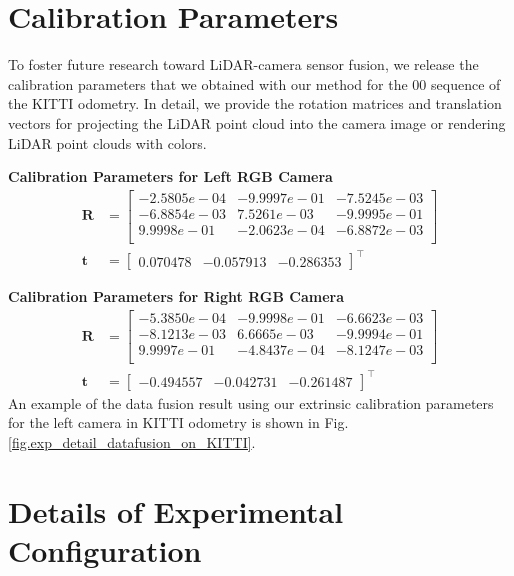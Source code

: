 \section{Calibration Parameters}
To foster future research toward LiDAR-camera sensor
fusion, we release the calibration parameters that we obtained with our method for the 00 sequence of the KITTI odometry. In detail, we provide the rotation matrices and translation vectors for projecting the LiDAR point cloud into the camera image or rendering LiDAR point clouds with colors. 

\noindent \textbf{Calibration Parameters for Left RGB Camera}
\[
\begin{aligned}
\boldsymbol{R} &= 
\begin{bmatrix}
-2.5805e-04 &-9.9997e-01 &-7.5245e-03 \\
-6.8854e-03 &7.5261e-03 &-9.9995e-01 \\
9.9998e-01 &-2.0623e-04 &-6.8872e-03 \\
\end{bmatrix} \\
\boldsymbol{t} &= 
\begin{bmatrix}
0.070478 &-0.057913 &-0.286353
\end{bmatrix}^\top
\end{aligned}
\]


\noindent \textbf{Calibration Parameters for Right RGB Camera}
\[
\begin{aligned}
\boldsymbol{R} &= 
\begin{bmatrix}
-5.3850e-04 &-9.9998e-01 &-6.6623e-03 \\
-8.1213e-03 &6.6665e-03 &-9.9994e-01 \\
9.9997e-01 &-4.8437e-04 &-8.1247e-03 \\
\end{bmatrix} \\
\boldsymbol{t} &= 
\begin{bmatrix}
-0.494557 &-0.042731 &-0.261487 
\end{bmatrix}^\top
\end{aligned}
\]
An example of the data fusion result using our extrinsic calibration parameters for the left camera in KITTI odometry is shown in Fig. \ref{fig.exp_detail_datafusion_on_KITTI}.


\section{Details of Experimental Configuration}
\label{sec.sup_exp_config_detail}

